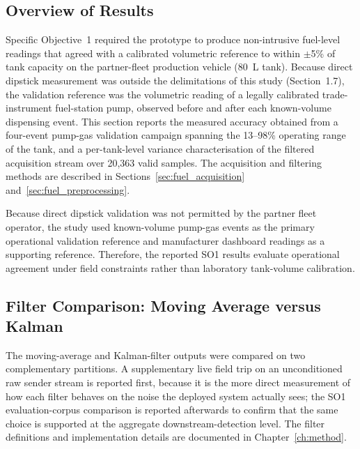 \subsection{Overview of Results}
Specific Objective~1 required the prototype to produce non-intrusive fuel-level readings that agreed with a calibrated volumetric reference to within $\pm$5\% of tank capacity on the partner-fleet production vehicle (80~L tank). Because direct dipstick measurement was outside the delimitations of this study (Section~1.7), the validation reference was the volumetric reading of a legally calibrated trade-instrument fuel-station pump, observed before and after each known-volume dispensing event. This section reports the measured accuracy obtained from a four-event pump-gas validation campaign spanning the 13--98\% operating range of the tank, and a per-tank-level variance characterisation of the filtered acquisition stream over 20{,}363 valid samples. The acquisition and filtering methods are described in Sections~\ref{sec:fuel_acquisition} and~\ref{sec:fuel_preprocessing}.

Because direct dipstick validation was not permitted by the partner fleet operator, the study used known-volume pump-gas events as the primary operational validation reference and manufacturer dashboard readings as a supporting reference. Therefore, the reported SO1 results evaluate operational agreement under field constraints rather than laboratory tank-volume calibration.

\subsection{Filter Comparison: Moving Average versus Kalman}
\label{sec:so1_filter_comparison}

The moving-average and Kalman-filter outputs were compared on two complementary partitions. A supplementary live field trip on an unconditioned raw sender stream is reported first, because it is the more direct measurement of how each filter behaves on the noise the deployed system actually sees; the SO1 evaluation-corpus comparison is reported afterwards to confirm that the same choice is supported at the aggregate downstream-detection level. The filter definitions and implementation details are documented in Chapter~\ref{ch:method}.

